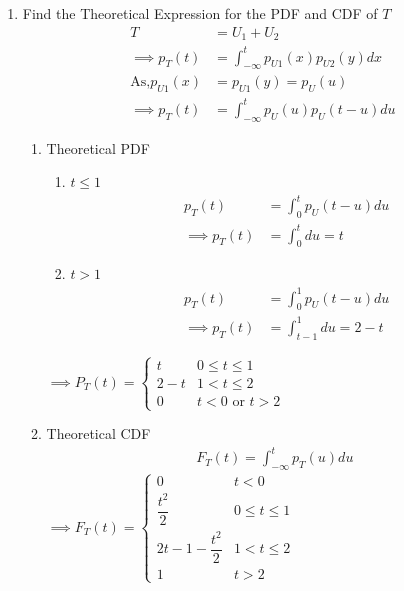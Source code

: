 \documentclass[journal,12pt,twocolumn]{IEEEtran}
\renewcommand\thesection{\arabic{section}}
\begin{document}
\begin{enumerate}[label=\thesection.\arabic*
,ref=\thesection.\theenumi]
\item Find the Theoretical Expression for the PDF and CDF of $T$\\
\solution
\begin{align}
    T&=U_1+U_2\\
    \implies p_T(t)&=\int_{-\infty}^{t}p_{U1}(x)p_{U2}(y)dx\\
    \text{As,}p_{U1}(x)&=p_{U1}(y)=p_{U}(u)\\
    \implies p_T(t)&=\int_{-\infty}^{t}p_{U}(u)p_{U}(t-u)du
    \end{align}
    \begin{enumerate}
        \item Theoretical PDF 
        \begin{enumerate}
            \item $t\le 1$
            \begin{align}
                p_T(t)&=\int_{0}^{t}p_{U}(t-u)du\\
                \implies p_T(t)&=\int_{0}^{t} du=t
            \end{align}
            \item $t> 1$
             \begin{align}
                p_T(t)&=\int_{0}^{1}p_{U}(t-u)du\\
                \implies p_T(t)&=\int_{t-1}^{1} du=2-t
            \end{align}
        \end{enumerate}
        $\implies\boxed{ P_T(t) =
        \begin{cases}
         t     &0 \le t \le 1 \\
         2-t   &1 < t \le 2\\
         0     &t<0 \text{ or }t>2
        \end{cases}
        }$\\
        \item Theoretical CDF 
        \begin{align}
            F_T(t)=\int_{-\infty}^{t}p_T(u)du
        \end{align}
        $\implies\boxed{
            F_{T}(t)=
            \begin{cases}
             0   &t<0\\
             \dfrac{t^2}{2} &0\le t \le 1\\
             2t-1-\dfrac{t^2}{2} &1<t \le 2\\
             1 &t>2
            \end{cases}
            }$\\

\end{enumerate}
\end{enumerate}
\end{document}
